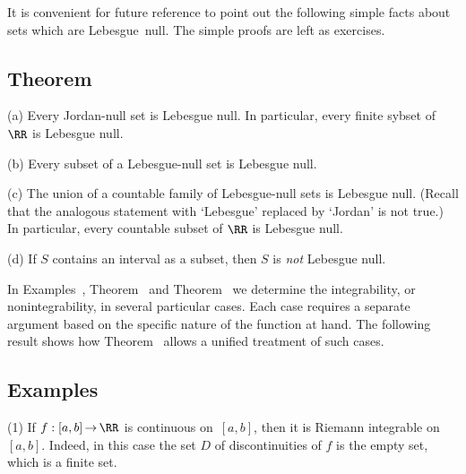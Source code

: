 \VV

        It is convenient for future reference to point out the following simple facts about sets which are Lebesgue~null. The simple proofs are left as exercises. %

\V

        \subsection{\small{{\bf Theorem}}}
        \label{ThmH20.75AB}

\V

\hspace*{\parindent}(a) Every Jordan-null set is Lebesgue null. In particular, every finite sybset of ${\RR}$ is Lebesgue null.

\V

        (b) Every subset of a Lebesgue-null set is Lebesgue null.

\V

        (c) The union of a countable family of Lebesgue-null sets is Lebesgue null. (Recall that the analogous statement with `Lebesgue' replaced by `Jordan' is not true.)
    In particular, every countable subset of ${\RR}$ is Lebesgue null.

\V

        (d) If $S$ contains an interval as a subset, then $S$ is {\em not} Lebesgue null.

\VV

        In Examples~, Theorem~ and Theorem~ we determine the integrability, or nonintegrability, in several particular cases.
    Each case requires a separate argument based on the specific nature of the function at hand.
 The following result shows how Theorem~ allows a unified treatment of such cases.

\VV


        \subsection{\small{{\bf Examples}}}
        \label{ExampH20.75B}

\V%

\hspace*{\parindent}(1) If $f:[a,b] \,{\rightarrow}\, {\RR}$ is continuous on~$[a,b]$, then it is Riemann integrable on~$[a,b]$.
    Indeed, in this case the set $D$ of discontinuities of $f$ is the empty set, which is a finite set.

